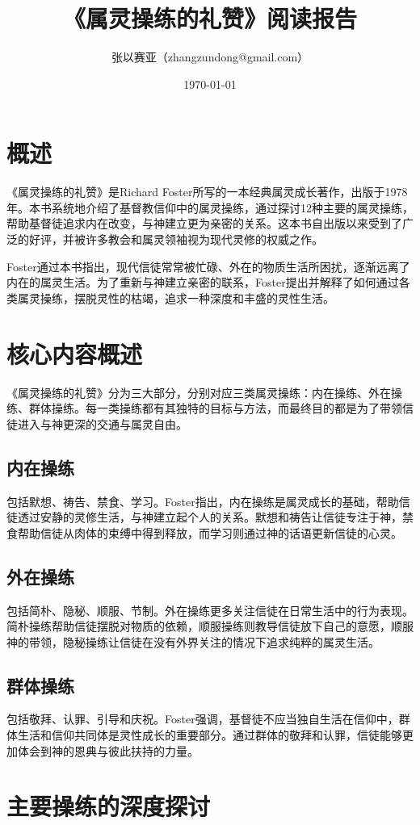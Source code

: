\documentclass[12pt, a4paper]{ctexart}
\title{《属灵操练的礼赞》阅读报告}
\author{张以赛亚（zhangzundong@gmail.com）}
\date{\today}
\begin{document}

\tableofcontents
\newpage
\section{概述}
《属灵操练的礼赞》是Richard Foster所写的一本经典属灵成长著作，出版于1978年。本书系统地介绍了基督教信仰中的属灵操练，通过探讨12种主要的属灵操练，帮助基督徒追求内在改变，与神建立更为亲密的关系。这本书自出版以来受到了广泛的好评，并被许多教会和属灵领袖视为现代灵修的权威之作。

Foster通过本书指出，现代信徒常常被忙碌、外在的物质生活所困扰，逐渐远离了内在的属灵生活。为了重新与神建立亲密的联系，Foster提出并解释了如何通过各类属灵操练，摆脱灵性的枯竭，追求一种深度和丰盛的灵性生活。
\section{核心内容概述}
《属灵操练的礼赞》分为三大部分，分别对应三类属灵操练：内在操练、外在操练、群体操练。每一类操练都有其独特的目标与方法，而最终目的都是为了带领信徒进入与神更深的交通与属灵自由。
\subsection{内在操练}
包括默想、祷告、禁食、学习。Foster指出，内在操练是属灵成长的基础，帮助信徒透过安静的灵修生活，与神建立起个人的关系。默想和祷告让信徒专注于神，禁食帮助信徒从肉体的束缚中得到释放，而学习则通过神的话语更新信徒的心灵。
\subsection{外在操练}
包括简朴、隐秘、顺服、节制。外在操练更多关注信徒在日常生活中的行为表现。简朴操练帮助信徒摆脱对物质的依赖，顺服操练则教导信徒放下自己的意愿，顺服神的带领，隐秘操练让信徒在没有外界关注的情况下追求纯粹的属灵生活。
\subsection{群体操练}
包括敬拜、认罪、引导和庆祝。Foster强调，基督徒不应当独自生活在信仰中，群体生活和信仰共同体是灵性成长的重要部分。通过群体的敬拜和认罪，信徒能够更加体会到神的恩典与彼此扶持的力量。
\section{主要操练的深度探讨}
\end{document}
